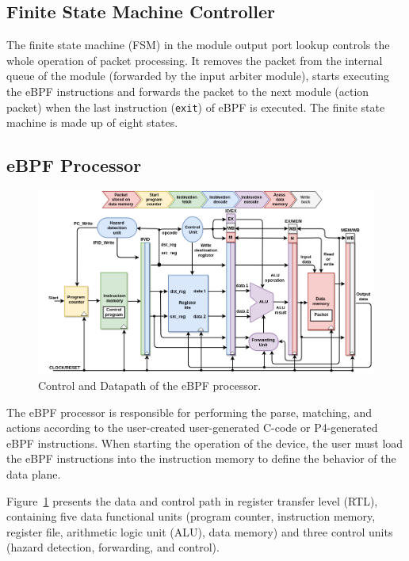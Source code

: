 \subsection{Finite State Machine Controller}

The finite state machine (FSM) in the module output port lookup controls the whole operation of packet processing. It removes the packet from the internal queue of the module (forwarded by the input arbiter module), starts executing the eBPF instructions and forwards the packet to the next module (action packet) when the last instruction (\texttt{exit}) of eBPF is executed. The finite state machine is made up of eight states.

\subsection{eBPF Processor}

\begin{figure}[hbt]
\centering
\includegraphics[width=.9\textwidth]{figures/06_fig02.png}
\caption{Control and Datapath of the eBPF processor.}
\label{fig:06_fig02}
\end{figure}


The eBPF processor is responsible for performing the parse, matching, and actions according to the user-created user-generated C-code or P4-generated eBPF instructions. When starting the operation of the device, the user must load the eBPF instructions into the instruction memory to define  the behavior of the data plane.

Figure~\ref{fig:06_fig02} presents the data and control path in register transfer level (RTL), containing five data functional units (program counter, instruction memory, register file, arithmetic logic unit (ALU), data memory) and three control units (hazard detection, forwarding, and control).

